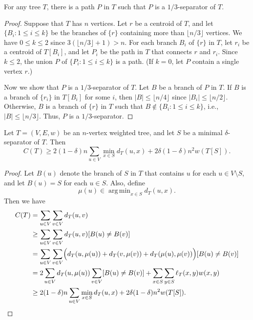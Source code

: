 \documentclass[11pt]{article}
\DeclareMathOperator*{\argmin}{arg \, min}
\begin{document}
\begin{proposition}
  For any tree $T$, there is a path $P$ in $T$ such that $P$ is a $1/3$-separator of $T$.
\end{proposition}
\begin{proof}
  Suppose that $T$ has $n$ vertices.
  Let $r$ be a centroid of $T$, and let $\{B_i: 1 \leq i \leq k\}$ be the branches of $\{r\}$ containing more than $\lfloor n/3 \rfloor$ vertices.
  We have $0 \leq k \leq 2$ since $3(\lfloor n/3 \rfloor + 1) > n$.
  For each branch $B_i$ of $\{r\}$ in $T$, let $r_i$ be a centroid of $T[B_i]$, and let $P_i$ be the path in $T$ that connects $r$ and $r_i$.
  Since $k \leq 2$, the union $P$ of $\{P_i: 1 \leq i \leq k\}$ is a path.
  (If $k = 0$, let $P$ contain a single vertex $r$.)
  \par Now we show that $P$ is a $1/3$-separator of $T$.
  Let $B$ be a branch of $P$ in $T$.
  If $B$ is a branch of $\{r_i\}$ in $T[B_i]$ for some $i$, then $|B| \leq \lfloor n/4 \rfloor$ since $|B_i| \leq \lfloor n/2 \rfloor$.
  Otherwise, $B$ is a branch of $\{r\}$ in $T$ such that $B \notin \{B_i: 1 \leq i \leq k\}$, i.e., $|B| \leq \lfloor n/3 \rfloor$.
  Thus, $P$ is a $1/3$-separator.
\end{proof}

\begin{theorem}
  Let $T = (V, E, w)$ be an $n$-vertex weighted tree, and let $S$ be a minimal $\delta$-separator of $T$.
  Then
  \begin{equation*}
    C(T) \geq 2(1-\delta)n \sum_{u \in V} \min_{x \in S} d_T(u, x) + 2\delta(1-\delta)n^2 w(T[S]).
  \end{equation*}
\end{theorem}
\begin{proof}
  Let $B(u)$ denote the branch of $S$ in $T$ that contains $u$ for each $u \in V \setminus S$, and let $B(u) = S$ for each $u \in S$.
  Also, define
  \begin{equation*}
    \mu(u) \in \argmin_{x \in S} d_T(u, x).
  \end{equation*}
  Then we have
  \begin{align*}
    C(T)
    &= \sum_{u \in V} \sum_{v \in V} d_T(u, v) \\
    &\geq \sum_{u \in V} \sum_{v \in V} d_T(u, v) [B(u) \neq B(v)] \\
    &= \sum_{u \in V} \sum_{v \in V} \Bigl(d_T(u, \mu(u)) + d_T(v, \mu(v)) + d_T(\mu(u), \mu(v))\Bigr) [B(u) \neq B(v)] \\
    &= 2 \sum_{u \in V} d_T(u, \mu(u)) \sum_{v \in V} [B(u) \neq B(v)] + \sum_{x \in S} \sum_{y \in S} \ell_T(x, y) w(x, y) \\
    &\geq 2(1-\delta)n \sum_{u \in V} \min_{x \in S} d_T(u, x) + 2\delta(1-\delta)n^2 w(T[S]).
    \qedhere
  \end{align*}
\end{proof}
\end{document}
